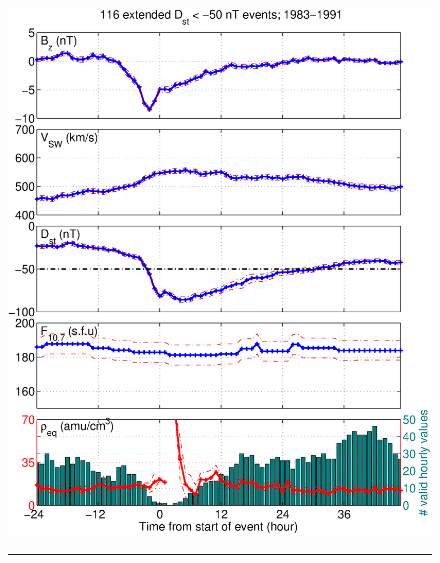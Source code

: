 \documentclass[12pt]{article}
\providecommand{\DIFaddbeginFL}{} %
\providecommand{\DIFaddendFL}{} %
\providecommand{\DIFdelbeginFL}{} %
\providecommand{\DIFdelendFL}{} %
\begin{document}
\begin{figure}[tp!]
\centering
\DIFdelbeginFL %
\DIFdelendFL \DIFaddbeginFL \includegraphics[scale=0.40]{UsedFigures/2016SW001507R-p04a.eps}
\DIFaddendFL \\
\rule[1ex]{5cm}{1pt}
\\
\DIFdelbeginFL %

\end{figure}
\end{document}

